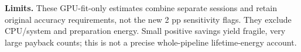 \documentclass[10pt,a4paper]{article}
\begin{document}




\textbf{Limits.} These GPU-fit-only estimates combine separate sessions and retain original accuracy requirements, not the new 2 pp sensitivity flags. They exclude CPU/system and preparation energy. Small positive savings yield fragile, very large payback counts; this is not a precise whole-pipeline lifetime-energy account.
\end{document}
